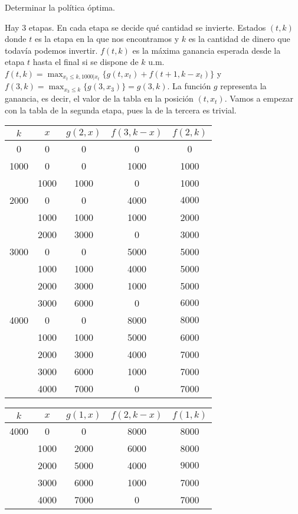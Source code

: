 \documentclass[twoside]{article}
\begin{document}
\begin{ejercicio}{1}
\begin{center}
\begin{tabular}{c |c c c c}
\end{tabular}
\end{center}
Determinar la política óptima.
\begin{solucion}
Hay 3 etapas. En cada etapa se decide qué cantidad se invierte. Estados $(t,k)$ donde $t$ es la etapa en la que nos encontramos y $k$ es la cantidad de dinero que todavía podemos invertir. $f(t,k)$ es la máxima ganancia esperada desde la etapa $t$ hasta el final si se dispone de $k$ u.m.
$f(t,k)=\max_{x_t\leq k,1000|x_t}\{g(t,x_t)+f(t+1,k-x_t)\}$ y $f(3,k)=\max_{x_3\leq k}\{g(3,x_3)\}=g(3,k)$. La función $g$ representa la ganancia, es decir, el valor de la tabla en la posición $(t,x_t)$. Vamos a empezar con la tabla de la segunda etapa, pues la de la tercera es trivial.
\begin{center}
\begin{tabular}{|c| c| c| c| c|}
\hline
$k$ & $x$ & $g(2,x)$ & $f(3,k-x)$ & $f(2,k)$\\
\hline
0   &  0  & 0        &  0      &  0\\
\hline
\hline
1000    &  0  & 0       &   1000 & 1000\\
     &  1000  & 1000 & 0         & 1000\\
     \hline
     \hline
2000 &  0     & 0        &  4000 & $\boxed{4000}$\\
  &  1000     & 1000     & 1000  & 2000\\
  &  2000     & 3000     &  0    & 3000\\
  \hline
  \hline
3000 & 0	& 0	& 5000 & 5000\\
	 & 1000 & 1000 & 4000 & 5000\\
	 & 2000 & 3000 & 1000 & 5000\\
	 & 3000 & 6000 & 0  & $\boxed{6000}$\\
\hline
\hline
4000 & 0   & 0 & 8000 & $\boxed{8000}$\\
	 & 1000 & 1000 & 5000 & 6000\\
	 & 2000 & 3000 & 4000 & 7000\\
	 & 3000 & 6000 & 1000 & 7000\\
	 & 4000 & 7000 & 0 & 7000\\
	 \hline
\end{tabular}

\vspace{0.5em}

\begin{tabular}{|c|c|c|c|c|}
\hline
$k$ & $x$ & $g(1,x)$ & $f(2,k-x)$ &$f(1,k)$\\
\hline
4000 & 0   & 0       &  8000 & 8000\\
	 & 1000 & 2000   &   6000 & 8000 \\
	 & 2000 &  5000 &   4000 & $\boxed{9000}$\\
	 & 3000 & 6000  &   1000 & 7000\\
	 & 4000 & 7000 &   0     & 7000\\
	 \hline
\end{tabular}


\end{center}
\end{solucion}
\end{ejercicio}
\end{document}

